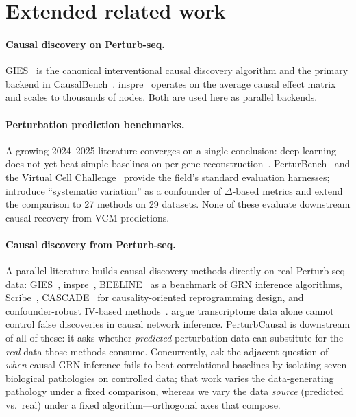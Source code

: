 \documentclass{article}
\theoremstyle{plain}
\theoremstyle{definition}
\theoremstyle{remark}
\begin{document}
\section{Extended related work}
\label{app:related-extended}

\paragraph{Causal discovery on Perturb-seq.} GIES~\citep{hauser2012gies} is the canonical interventional causal discovery algorithm and the primary backend in CausalBench~\citep{chevalley2025causalbench}. inspre~\citep{brown2025inspre} operates on the average causal effect matrix and scales to thousands of nodes. Both are used here as parallel backends.

\paragraph{Perturbation prediction benchmarks.} A growing 2024--2025 literature converges on a single conclusion: deep learning does not yet beat simple baselines on per-gene reconstruction~\citep{ahlmanneltze2025,wong2025simple,csendes2025benchmark,wei2025benchmark,vinas2025systema,bendidi2024pca,wenteler2025perteval,zhu2025garm,li2025systematic,mejia2025diversity}. PerturBench~\citep{wu2024perturbench} and the Virtual Cell Challenge~\citep{roohani2025vcc} provide the field's standard evaluation harnesses; \citet{vinas2025systema} introduce ``systematic variation'' as a confounder of $\Delta$-based metrics and \citet{wei2025benchmark} extend the comparison to 27 methods on 29 datasets. None of these evaluate downstream causal recovery from VCM predictions.

\paragraph{Causal discovery from {Perturb-seq}.} A parallel literature builds causal-discovery methods directly on real Perturb-seq data: GIES~\citep{hauser2012gies}, inspre~\citep{brown2025inspre}, BEELINE~\citep{pratapa2019beeline} as a benchmark of GRN inference algorithms, Scribe~\citep{qiu2020scribe}, CASCADE~\citep{cao2025cascade} for causality-oriented reprogramming design, and confounder-robust IV-based methods~\citep{park2026confounder}. \citet{kernfeld2024fdr} argue transcriptome data alone cannot control false discoveries in causal network inference. {PerturbCausal} is downstream of all of these: it asks whether \emph{predicted} perturbation data can substitute for the \emph{real} data those methods consume. Concurrently, \citet{fernandez2026grnbreak} ask the adjacent question of \emph{when} causal GRN inference fails to beat correlational baselines by isolating seven biological pathologies on controlled data; that work varies the data-generating pathology under a fixed comparison, whereas we vary the data \emph{source} (predicted vs.\ real) under a fixed algorithm---orthogonal axes that compose.
\end{document}
